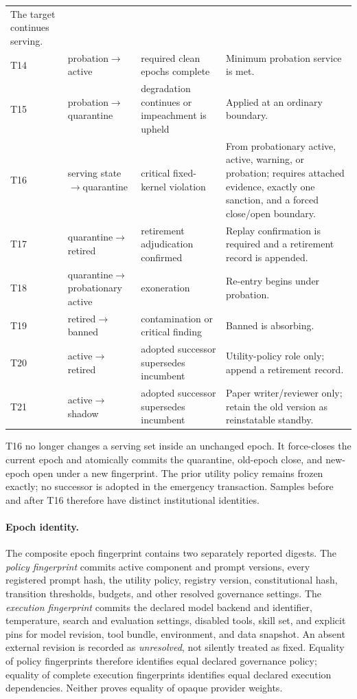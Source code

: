 \begin{longtable}{@{}p{}p{}p{}p{}@{}}
    The target continues serving.\\
  T14 & probation$\rightarrow$active & required clean epochs complete &
    Minimum probation service is met.\\
  T15 & probation$\rightarrow$quarantine & degradation continues or impeachment is upheld &
    Applied at an ordinary boundary.\\
  T16 & serving state$\rightarrow$quarantine & critical fixed-kernel violation &
    From probationary active, active, warning, or probation; requires attached
    evidence, exactly one sanction, and a forced close/open boundary.\\
  T17 & quarantine$\rightarrow$retired & retirement adjudication confirmed &
    Replay confirmation is required and a retirement record is appended.\\
  T18 & quarantine$\rightarrow$probationary active & exoneration &
    Re-entry begins under probation.\\
  T19 & retired$\rightarrow$banned & contamination or critical finding &
    Banned is absorbing.\\
  T20 & active$\rightarrow$retired & adopted successor supersedes incumbent &
    Utility-policy role only; append a retirement record.\\
  T21 & active$\rightarrow$shadow & adopted successor supersedes incumbent &
    Paper writer/reviewer only; retain the old version as reinstatable standby.\\
  \bottomrule
\end{longtable}
\normalsize

T16 no longer changes a serving set inside an unchanged epoch. It force-closes
the current epoch and atomically commits the quarantine, old-epoch close, and
new-epoch open under a new fingerprint. The prior utility policy remains
frozen exactly; no successor is adopted in the emergency transaction. Samples
before and after T16 therefore have distinct institutional identities.

\paragraph{Epoch identity.}
The composite epoch fingerprint contains two separately reported
digests. The \emph{policy fingerprint} commits active component and prompt
versions, every registered prompt hash, the utility policy, registry
version, constitutional hash, transition thresholds, budgets, and other
resolved governance settings. The \emph{execution fingerprint} commits
the declared model backend and identifier, temperature, search and
evaluation settings, disabled tools, skill set, and explicit pins for model
revision, tool bundle, environment, and data snapshot. An absent external
revision is recorded as
\emph{unresolved}, not silently treated as fixed. Equality of policy
fingerprints therefore identifies equal declared governance policy;
equality of complete execution fingerprints identifies equal declared
execution dependencies. Neither proves equality of opaque provider
weights.

